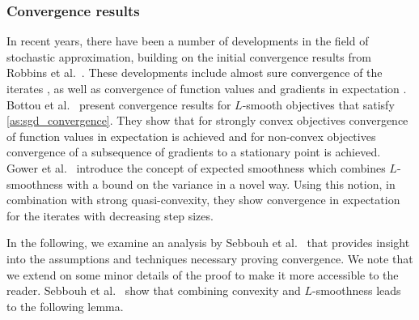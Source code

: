 \documentclass[12pt]{article}
\theoremstyle{definition}
\numberwithin{equation}{section}
\begin{document}
\subsubsection{Convergence results}
\label{sec:convergence_results}
In recent years, there have been a number of developments in the field of stochastic approximation, building on the initial convergence results from Robbins et al.\ \autocite{robbinsStochasticApproximationMethod1951}. These developments include almost sure convergence of the iterates \autocite{zhouStochasticMirrorDescent2017, nguyenSGDHogwildConvergence2018, sebbouhAlmostSureConvergence2021}, as well as convergence of function values and gradients in expectation \autocite{bottouOptimizationMethodsLargeScale2018}.  
Bottou et al.\ \autocite{bottouOptimizationMethodsLargeScale2018} present convergence results for $L$-smooth objectives that satisfy \autoref{as:sgd_convergence}. They show that for strongly convex objectives convergence of function values in expectation is achieved and for non-convex objectives convergence of a subsequence of gradients to a stationary point is achieved.  
Gower et al.\ \autocite{gowerSGDGeneralAnalysis2019} introduce the concept of expected smoothness which combines $L$-smoothness with a bound on the variance in a novel way. Using this notion, in combination with strong quasi-convexity, they show convergence in expectation for the iterates with decreasing step sizes.

In the following, we examine an analysis by Sebbouh et al.\ \autocite{sebbouhAlmostSureConvergence2021} that provides insight into the assumptions and techniques necessary proving convergence.
We note that we extend on some minor details of the proof to make it more accessible to the reader.
Sebbouh et al.\ \autocite{sebbouhAlmostSureConvergence2021} show that combining convexity and $L$-smoothness leads to the following lemma.
\end{document}
